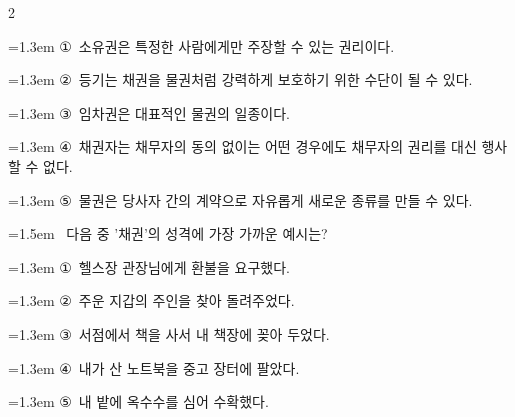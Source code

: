 \documentclass[10pt, a4paper]{article}
\begin{document}
\begin{multicols}{2}
\begin{minipage}{\columnwidth}
\vspace{0.5mm}
{\hangindent=1.3em  \noindent\hspace{0.3em}①~소유권은 특정한 사람에게만 주장할 수 있는 권리이다.\par}
{\hangindent=1.3em  \noindent\hspace{0.3em}②~등기는 채권을 물권처럼 강력하게 보호하기 위한 수단이 될 수 있다.\par}
{\hangindent=1.3em  \noindent\hspace{0.3em}③~임차권은 대표적인 물권의 일종이다.\par}
{\hangindent=1.3em  \noindent\hspace{0.3em}④~채권자는 채무자의 동의 없이는 어떤 경우에도 채무자의 권리를 대신 행사할 수 없다.\par}
{\hangindent=1.3em  \noindent\hspace{0.3em}⑤~물권은 당사자 간의 계약으로 자유롭게 새로운 종류를 만들 수 있다.\par}
\vspace{4mm}
\end{minipage}
\par

\noindent\begin{minipage}{\columnwidth}
\vspace{2mm}
{\hangindent=1.5em  ~다음 중 '채권'의 성격에 가장 가까운 예시는?\par}

\vspace{0.5mm}
{\hangindent=1.3em  \noindent\hspace{0.3em}①~헬스장 관장님에게 환불을 요구했다.\par}
{\hangindent=1.3em  \noindent\hspace{0.3em}②~주운 지갑의 주인을 찾아 돌려주었다.\par}
{\hangindent=1.3em  \noindent\hspace{0.3em}③~서점에서 책을 사서 내 책장에 꽂아 두었다.\par}
{\hangindent=1.3em  \noindent\hspace{0.3em}④~내가 산 노트북을 중고 장터에 팔았다.\par}
{\hangindent=1.3em  \noindent\hspace{0.3em}⑤~내 밭에 옥수수를 심어 수확했다.\par}
\vspace{4mm}
\end{minipage}
\par


\end{multicols}
\end{document}
